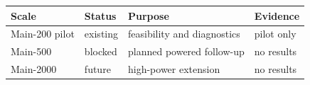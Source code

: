 \begin{tabular}{llll}
\toprule
Scale & Status & Purpose & Evidence \\ 
\midrule
Main-200 pilot & existing & feasibility and diagnostics & pilot only \\ 
Main-500 & blocked & planned powered follow-up & no results \\ 
Main-2000 & future & high-power extension & no results \\ 
\bottomrule
\end{tabular}
